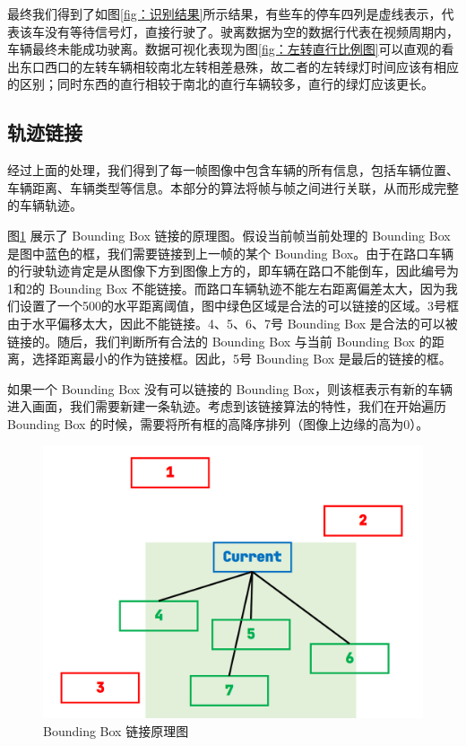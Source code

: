 最终我们得到了如图\ref{fig：识别结果}所示结果，有些车的停车四列是虚线表示，代表该车没有等待信号灯，直接行驶了。驶离数据为空的数据行代表在视频周期内，车辆最终未能成功驶离。数据可视化表现为图\ref{fig：左转直行比例图}可以直观的看出东口西口的左转车辆相较南北左转相差悬殊，故二者的左转绿灯时间应该有相应的区别；同时东西的直行相较于南北的直行车辆较多，直行的绿灯应该更长。

\subsection{轨迹链接}
经过上面的处理，我们得到了每一帧图像中包含车辆的所有信息，包括车辆位置、车辆距离、车辆类型等信息。本部分的算法将帧与帧之间进行关联，从而形成完整的车辆轨迹。

图\ref{fig:link} 展示了 Bounding Box 链接的原理图。假设当前帧当前处理的 Bounding Box 是图中蓝色的框，我们需要链接到上一帧的某个 Bounding Box。由于在路口车辆的行驶轨迹肯定是从图像下方到图像上方的，即车辆在路口不能倒车，因此编号为1和2的 Bounding Box 不能链接。而路口车辆轨迹不能左右距离偏差太大，因为我们设置了一个500的水平距离阈值，图中绿色区域是合法的可以链接的区域。3号框由于水平偏移太大，因此不能链接。4、5、6、7号 Bounding Box 是合法的可以被链接的。随后，我们判断所有合法的 Bounding Box 与当前 Bounding Box 的距离，选择距离最小的作为链接框。因此，5号 Bounding Box 是最后的链接的框。

如果一个 Bounding Box 没有可以链接的 Bounding Box，则该框表示有新的车辆进入画面，我们需要新建一条轨迹。考虑到该链接算法的特性，我们在开始遍历 Bounding Box 的时候，需要将所有框的高降序排列（图像上边缘的高为0）。

\begin{figure}[h]
    \centering
    \includegraphics[scale=0.2]{figures/link}
    \caption{Bounding Box 链接原理图}
    \label{fig:link}
\end{figure}

